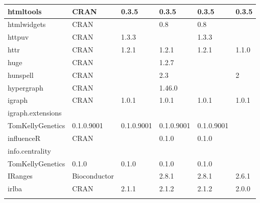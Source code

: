 \begin{longtable}{|llllll|}
htmltools                     & CRAN                      & 0.3.5       & 0.3.5       & 0.3.5          & 0.3.5             \\ \hline \rowcolor{gray!25}
htmlwidgets                   & CRAN                      &             & 0.8         & 0.8            &                  \\ \hline
httpuv                        & CRAN                      & 1.3.3       &             & 1.3.3          &                   \\ \hline \rowcolor{gray!25}
httr                          & CRAN                      & 1.2.1       & 1.2.1       & 1.2.1          & 1.1.0            \\ \hline
huge                          & CRAN                      &             & 1.2.7       &                &                   \\ \hline \rowcolor{gray!25}
hunspell                      & CRAN                      &             & 2.3         &                & 2                \\ \hline
hypergraph                    & CRAN                      &             & 1.46.0      &                &                   \\ \hline \rowcolor{gray!25}
igraph                        & CRAN                      & 1.0.1       & 1.0.1       & 1.0.1          & 1.0.1            \\ \hline
igraph.extensions             & \begin{tabular}[c]{@{}l@{}}GitHub \\ TomKellyGenetics \end{tabular}  & 0.1.0.9001  & 0.1.0.9001  & 0.1.0.9001     & 0.1.0.9001        \\ \hline \rowcolor{gray!25}
influenceR                    & CRAN                      &             & 0.1.0       & 0.1.0          &                  \\ \hline
info.centrality               & \begin{tabular}[c]{@{}l@{}}GitHub \\ TomKellyGenetics \end{tabular}  & 0.1.0       & 0.1.0       & 0.1.0          & 0.1.0             \\ \hline \rowcolor{gray!25}
IRanges                       & Bioconductor              &             & 2.8.1       & 2.8.1          & 2.6.1            \\ \hline
irlba                         & CRAN                      & 2.1.1       & 2.1.2       & 2.1.2          & 2.0.0             \\ \hline \rowcolor{gray!25}

\end{longtable}
